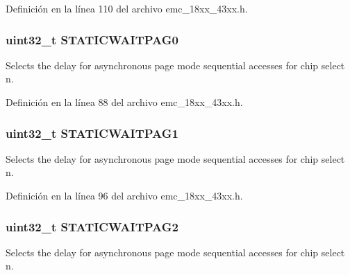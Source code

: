 Definición en la línea 110 del archivo emc\+\_\+18xx\+\_\+43xx.\+h.

\subsubsection[{\texorpdfstring{S\+T\+A\+T\+I\+C\+W\+A\+I\+T\+P\+A\+G0}{STATICWAITPAG0}}]{ uint32\+\_\+t S\+T\+A\+T\+I\+C\+W\+A\+I\+T\+P\+A\+G0}\hypertarget{struct_l_p_c___e_m_c___t_a1241bd2030e9a78e2ca7303815cdcc68}{}\label{struct_l_p_c___e_m_c___t_a1241bd2030e9a78e2ca7303815cdcc68}
Selects the delay for asynchronous page mode sequential accesses for chip select n. 

Definición en la línea 88 del archivo emc\+\_\+18xx\+\_\+43xx.\+h.

\subsubsection[{\texorpdfstring{S\+T\+A\+T\+I\+C\+W\+A\+I\+T\+P\+A\+G1}{STATICWAITPAG1}}]{ uint32\+\_\+t S\+T\+A\+T\+I\+C\+W\+A\+I\+T\+P\+A\+G1}\hypertarget{struct_l_p_c___e_m_c___t_af9e570addc8c728166bf254ab4191293}{}\label{struct_l_p_c___e_m_c___t_af9e570addc8c728166bf254ab4191293}
Selects the delay for asynchronous page mode sequential accesses for chip select n. 

Definición en la línea 96 del archivo emc\+\_\+18xx\+\_\+43xx.\+h.

\subsubsection[{\texorpdfstring{S\+T\+A\+T\+I\+C\+W\+A\+I\+T\+P\+A\+G2}{STATICWAITPAG2}}]{ uint32\+\_\+t S\+T\+A\+T\+I\+C\+W\+A\+I\+T\+P\+A\+G2}\hypertarget{struct_l_p_c___e_m_c___t_a35a85e6c6539d8f727424d4e38e6cbb8}{}\label{struct_l_p_c___e_m_c___t_a35a85e6c6539d8f727424d4e38e6cbb8}
Selects the delay for asynchronous page mode sequential accesses for chip select n. 


